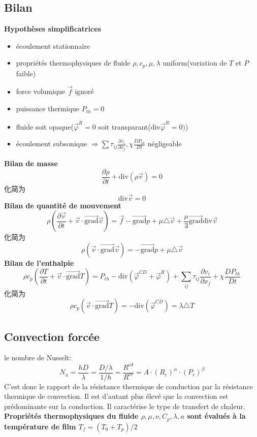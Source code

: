 \documentclass{article}
\begin{document}
\subsection{Bilan}
\textbf{Hypoth\`eses simplificatrices}
\begin{itemize}
\item \'ecoulement stationnaire
\item propri\'et\'es thermophysiques de fluide $\rho, c_p, \mu,\lambda $ uniform(variation de $T$ et $P$ faible)
\item force volumique $\vec{f}$ ignor\'e
\item puissance thermique $P_{th}=0$
\item fluide soit opaque($\vec{\varphi}^R = 0$ soit transparant($\mbox{div} \vec{\varphi}^R=0)$)
\item \'ecoulement subsonique $\Rightarrow \sum \tau_{ij}\frac{\partial  v_i}{\partial x_j},\chi\frac{ DP_{th}}{Dt}$ n\'egligeable
\end{itemize}
\textbf{Bilan de masse}
$$\frac{\partial  \rho}{\partial t} + \mbox{div} (\rho \vec{v})=0 $$
化简为
$$\mbox{div} \vec{v}=0$$
\textbf{Bilan de quantit\'e de mouvement}
$$
\rho(\frac{\partial  \vec{v}}{\partial t}+ \vec{v}\cdot \vec{\mbox{grad}}\vec{v}) =  \vec{f} - \vec{\mbox{grad}} p + \mu \triangle\vec{v} + \frac{\mu}{3}\vec{\mbox{grad}} \mbox{div} \vec{v}
$$
化简为
$$
\rho(  \vec{v}\cdot \vec{\mbox{grad}}\vec{v}) =   - \vec{\mbox{grad}} p + \mu \triangle\vec{v}
$$
\textbf{Bilan de l'enthalpie}
$$
\rho c_p (\frac{\partial  T}{\partial t} + \vec{v}\cdot \vec{\mbox{grad}} T)=P_{th} - \mbox{div} (\vec{\varphi}^{CD}+\vec{\varphi}^R) +  \sum_{ij} \tau_{ij}\frac{\partial  v_i}{\partial x_j} + \chi\frac{ DP_{th}}{Dt}
$$
化简为
$$
\rho c_p ( \vec{v}\cdot \vec{\mbox{grad}} T)=- \mbox{div} (\vec{\varphi}^{CD}) =\lambda \triangle T
$$

\subsection{Convection forc\'ee}
le nombre de Nusselt:$$N_u = \frac{hD}{\lambda }=\frac{D/\lambda }{1/h}=\frac{R^{cd}}{R^{cc}}=A\cdot (R_e)^{\alpha}\cdot (P_r)^{\beta}$$
C'est donc le rapport de la r\'esistance thermique de conduction par la r\'esistance thermique de convection. Il est d'autant plus \'elev\'e que la convection est pr\'edominante sur la conduction. Il caract\'erise le type de transfert
de chaleur.\\
\textbf{Propri\'et\'es thermophysiques du fluide $\rho, \mu, \nu, C_p, \lambda, a$ sont \'evalu\'es \`a la temp\'erature de film $T_f = (T_0 + T_p)/2$}
\end{document}
